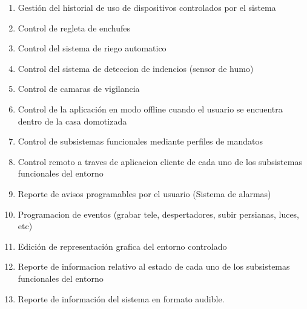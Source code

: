 \begin{enumerate}
    \item Gestión del historial de uso de dispositivos controlados por el sistema

    \item Control de regleta  de enchufes

    \item Control del sistema de riego automatico

    \item Control del sistema de deteccion de indencios (sensor de humo)

    \item Control de camaras de vigilancia

    \item Control de la aplicación en modo offline cuando el usuario se encuentra dentro de la casa domotizada

    \item Control de subsistemas funcionales mediante perfiles de mandatos

    \item Control remoto a traves de aplicacion cliente de cada uno de los subsistemas funcionales del entorno

    \item Reporte de avisos programables por el usuario (Sistema de alarmas)

    \item Programacion de eventos (grabar tele, despertadores, subir persianas, luces, etc)

    \item Edición de representación grafica del entorno controlado

    \item Reporte de informacion relativo al estado de cada uno de los subsistemas funcionales del entorno

    \item Reporte de información del sistema en formato audible.

\end{enumerate}
